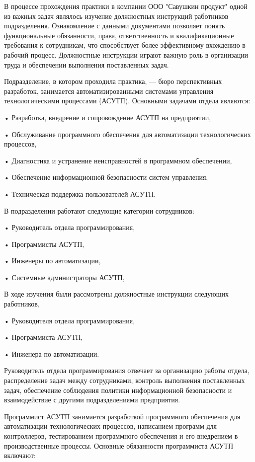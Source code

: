 {\gostFont
	
	\par \redline В процессе прохождения практики в компании ООО "Савушкин продукт" одной из важных задач являлось изучение должностных инструкций работников подразделения. Ознакомление с данными документами позволяет понять функциональные обязанности, права, ответственность и квалификационные требования к сотрудникам, что способствует более эффективному вхождению в рабочий процесс. Должностные инструкции играют важную роль в организации труда и обеспечении выполнения поставленных задач. 
	
	\par \redline Подразделение, в котором проходила практика, — бюро перспективных разработок, занимается автоматизированными системами управления технологическими процессами (АСУТП). Основными задачами отдела являются:
	
	\par \redline • Разработка, внедрение и сопровождение АСУТП на предприятии,
	\par \redline • Обслуживание программного обеспечения для автоматизации технологических процессов,
	\par \redline • Диагностика и устранение неисправностей в программном обеспечении,
	\par \redline • Обеспечение информационной безопасности систем управления,
	\par \redline • Техническая поддержка пользователей АСУТП.
	
	\par \redline В подразделении работают следующие категории сотрудников:
	\par \redline • Руководитель отдела программирования,
	\par \redline • Программисты АСУТП,
	\par \redline • Инженеры по автоматизации,
	\par \redline • Системные администраторы АСУТП,
	\par \redline В ходе изучения были рассмотрены должностные инструкции следующих работников,
	\par \redline • Руководителя отдела программирования,
	\par \redline • Программиста АСУТП,
	\par \redline • Инженера по автоматизации.
	
	\par \redline Руководитель отдела программирования отвечает за организацию работы отдела, распределение задач между сотрудниками, контроль выполнения поставленных задач, обеспечение соблюдения политики информационной безопасности и взаимодействие с другими подразделениями предприятия.
	\par \redline Программист АСУТП занимается разработкой программного обеспечения для автоматизации технологических процессов, написанием программ для контроллеров, тестированием программного обеспечения и его внедрением в производственные процессы. Основные обязанности программиста АСУТП включают:
	
}
